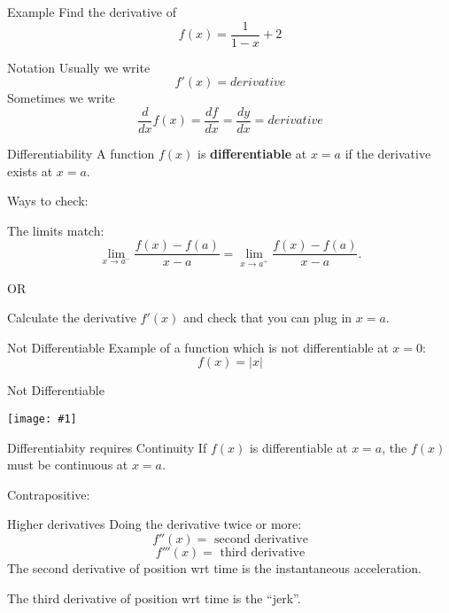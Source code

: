 \documentclass[t]{beamer}
\newcommand{\img}[1]{
\vfill
\texttt{[image: \#1]}
\vfill
}
\begin{document}
\begin{frame}{Example}
Find the derivative of
$$f(x) = \frac{1}{1-x} + 2$$
\end{frame}

\begin{frame}{Notation}
Usually we write
$$f'(x) = derivative$$
Sometimes we write
$$\frac{d}{dx} f(x) = \frac{df}{dx} = \frac{dy}{dx} = derivative$$
\end{frame}

\begin{frame}{Differentiability}
A function $f(x)$ is \textbf{differentiable} at $x = a$ if the derivative exists at $x = a.$

Ways to check:

The limits match:
$$\lim_{x \to a^-} \frac{f(x) - f(a)}{x - a} = \lim_{x \to a^+} \frac{f(x) - f(a)}{x-a}.$$

OR

Calculate the derivative $f'(x)$ and check that you can plug in $x = a$.
\end{frame}

\begin{frame}{Not Differentiable}
Example of a function which is not differentiable at $x = 0$: 
$$f(x) = |x|$$
\end{frame}

\begin{frame}{Not Differentiable}
\img{notdiff}
\end{frame}

\begin{frame}{Differentiabity requires Continuity}
If $f(x)$ is differentiable at $x=a$, the $f(x)$ must be continuous at $x = a$.

Contrapositive:
\end{frame}

\begin{frame}{Higher derivatives}
Doing the derivative twice or more:
$$f''(x) = \text{ second derivative}$$
$$ f'''(x) = \text{ third derivative}$$
The second derivative of position wrt time is the instantaneous acceleration.

The third derivative of position wrt time  is the ``jerk''.
\end{frame}
\end{document}
